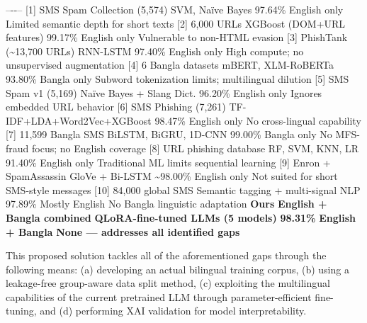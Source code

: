 \textbar\textbar\textbar--\textbar-\textbar-\textbar--\textbar{}
\textbar{} {[}1{]} \textbar{} SMS Spam Collection (5,574) \textbar{}
SVM, Naïve Bayes \textbar{} 97.64\% \textbar{} English only \textbar{}
Limited semantic depth for short texts \textbar{} \textbar{} {[}2{]}
\textbar{} 6,000 URLs \textbar{} XGBoost (DOM+URL features) \textbar{}
99.17\% \textbar{} English only \textbar{} Vulnerable to non-HTML
evasion \textbar{} \textbar{} {[}3{]} \textbar{} PhishTank
(\textasciitilde13,700 URLs) \textbar{} RNN-LSTM \textbar{} 97.40\%
\textbar{} English only \textbar{} High compute; no unsupervised
augmentation \textbar{} \textbar{} {[}4{]} \textbar{} 6 Bangla datasets
\textbar{} mBERT, XLM-RoBERTa \textbar{} 93.80\% \textbar{} Bangla only
\textbar{} Subword tokenization limits; multilingual dilution \textbar{}
\textbar{} {[}5{]} \textbar{} SMS Spam v1 (5,169) \textbar{} Naïve Bayes
+ Slang Dict. \textbar{} 96.20\% \textbar{} English only \textbar{}
Ignores embedded URL behavior \textbar{} \textbar{} {[}6{]} \textbar{}
SMS Phishing (7,261) \textbar{} TF-IDF+LDA+Word2Vec+XGBoost \textbar{}
98.47\% \textbar{} English only \textbar{} No cross-lingual capability
\textbar{} \textbar{} {[}7{]} \textbar{} 11,599 Bangla SMS \textbar{}
BiLSTM, BiGRU, 1D-CNN \textbar{} 99.00\% \textbar{} Bangla only
\textbar{} No MFS-fraud focus; no English coverage \textbar{} \textbar{}
{[}8{]} \textbar{} URL phishing database \textbar{} RF, SVM, KNN, LR
\textbar{} 91.40\% \textbar{} English only \textbar{} Traditional ML
limits sequential learning \textbar{} \textbar{} {[}9{]} \textbar{}
Enron + SpamAssassin \textbar{} GloVe + Bi-LSTM \textbar{}
\textasciitilde98.00\% \textbar{} English only \textbar{} Not suited for
short SMS-style messages \textbar{} \textbar{} {[}10{]} \textbar{}
84,000 global SMS \textbar{} Semantic tagging + multi-signal NLP
\textbar{} 97.89\% \textbar{} Mostly English \textbar{} No Bangla
linguistic adaptation \textbar{} \textbar{} \textbf{Ours} \textbar{}
\textbf{English + Bangla combined} \textbar{} \textbf{QLoRA-fine-tuned
LLMs (5 models)} \textbar{} \textbf{98.31\%} \textbar{} \textbf{English
+ Bangla} \textbar{} \textbf{None --- addresses all identified gaps}
\textbar{}

This proposed solution tackles all of the aforementioned gaps through
the following means: (a) developing an actual bilingual training corpus,
(b) using a leakage-free group-aware data split method, (c) exploiting
the multilingual capabilities of the current pretrained LLM through
parameter-efficient fine-tuning, and (d) performing XAI validation for
model interpretability.


